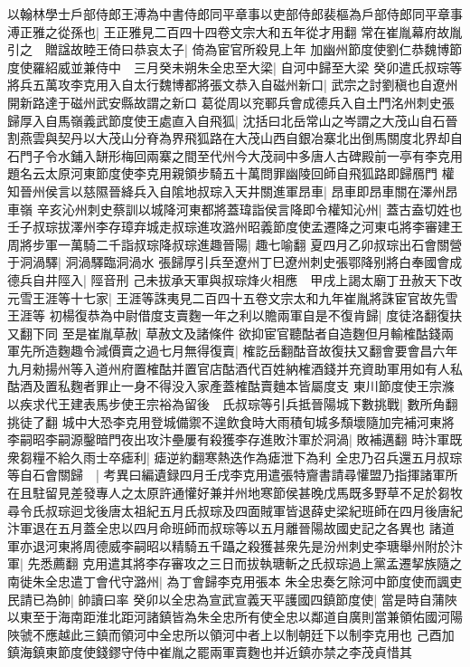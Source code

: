 以翰林學士戶部侍郎王溥為中書侍郎同平章事以吏部侍郎裴樞為戶部侍郎同平章事溥正雅之從孫也|{
	王正雅見二百四十四卷文宗大和五年從才用翻}
常在崔胤幕府故胤引之　贈諡故睦王倚曰恭哀太子|{
	倚為宦官所殺見上年}
加幽州節度使劉仁恭魏博節度使羅紹威並兼侍中　三月癸未朔朱全忠至大梁|{
	自河中歸至大梁}
癸卯遣氏叔琮等將兵五萬攻李克用入自太行魏博都將張文恭入自磁州新口|{
	武宗之討劉稹也自遼州開新路達于磁州武安縣故謂之新口}
葛從周以兖鄆兵會成德兵入自土門洺州刺史張歸厚入自馬嶺義武節度使王處直入自飛狐|{
	沈括曰北岳常山之岑謂之大茂山自石晉割燕雲與契丹以大茂山分脊為界飛狐路在大茂山西自銀冶寨北出倒馬關度北界却自石門子令水鋪入缾形梅回兩寨之間至代州今大茂祠中多唐人古碑殿前一亭有李克用題名云太原河東節度使李克用親領步騎五十萬問罪幽陵回師自飛狐路即歸鴈門}
權知晉州侯言以慈隰晉絳兵入自隂地叔琮入天井關進軍昂車|{
	昂車即昂車關在澤州昂車嶺}
辛亥沁州刺史蔡訓以城降河東都將蓋瑋詣侯言降即令權知沁州|{
	蓋古盍切姓也}
壬子叔琮拔澤州李存璋弃城走叔琮進攻潞州昭義節度使孟遷降之河東屯將李審建王周將步軍一萬騎二千詣叔琮降叔琮進趣晉陽|{
	趣七喻翻}
夏四月乙卯叔琮出石會關營于洞渦驛|{
	洞渦驛臨洞渦水}
張歸厚引兵至遼州丁巳遼州刺史張鄂降别將白奉國會成德兵自井陘入|{
	陘音刑}
己未拔承天軍與叔琮烽火相應　甲戌上謁太廟丁丑赦天下改元雪王涯等十七家|{
	王涯等誅夷見二百四十五卷文宗太和九年崔胤將誅宦官故先雪王涯等}
初楊復恭為中尉借度支賣麴一年之利以贍兩軍自是不復肯歸|{
	度徒洛翻復扶又翻下同}
至是崔胤草赦|{
	草赦文及諸條件}
欲抑宦官聽酤者自造麴但月輸榷酤錢兩軍先所造麴趣令減價賣之過七月無得復賣|{
	榷訖岳翻酤音故復扶又翻會要會昌六年九月勑揚州等入道州府置榷酤并置官店酤酒代百姓納榷酒錢并充資助軍用如有人私酤酒及置私麴者罪止一身不得没入家產蓋榷酤賣麯本皆屬度支}
東川節度使王宗滌以疾求代王建表馬步使王宗裕為留後　氏叔琮等引兵抵晉陽城下數挑戰|{
	數所角翻挑徒了翻}
城中大恐李克用登城備禦不遑飲食時大雨積旬城多頹壞隨加完補河東將李嗣昭李嗣源鑿暗門夜出攻汴壘屢有殺獲李存進敗汴軍於洞渦|{
	敗補邁翻}
時汴軍既衆芻糧不給久雨士卒瘧利|{
	瘧逆約翻寒熱迭作為瘧泄下為利}
全忠乃召兵還五月叔琮等自石會關歸　|{
	考異曰編遺録四月壬戌李克用遣張特齎書請尋懽盟乃指揮諸軍所在且駐留見差發專人之太原許通懽好兼并州地寒節侯甚晚戊馬既多野草不足於芻牧尋令氏叔琮迴戈後唐太祖紀五月氏叔琮及四面賊軍皆退薛史梁紀班師在四月後唐紀汴軍退在五月蓋全忠以四月命班師而叔琮等以五月離晉陽故國史記之各異也}
諸道軍亦退河東將周德威李嗣昭以精騎五千躡之殺獲甚衆先是汾州刺史李瑭舉州附於汴軍|{
	先悉薦翻}
克用遣其將李存審攻之三日而拔執瑭斬之氏叔琮過上黨孟遷挈族隨之南徙朱全忠遣丁會代守潞州|{
	為丁會歸李克用張本}
朱全忠奏乞除河中節度使而諷吏民請已為帥|{
	帥讀曰率}
癸卯以全忠為宣武宣義天平護國四鎮節度使|{
	當是時自蒲陜以東至于海南距淮北距河諸鎮皆為朱全忠所有使全忠以鄰道自廣則當兼領佑國河陽陜虢不應越此三鎮而領河中全忠所以領河中者上以制朝廷下以制李克用也}
己酉加鎮海鎮東節度使錢鏐守侍中崔胤之罷兩軍賣麴也并近鎮亦禁之李茂貞惜其

